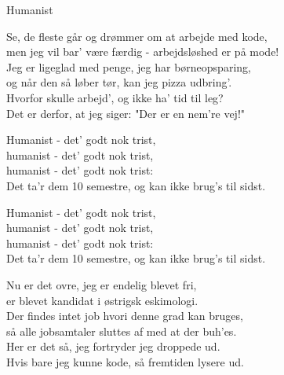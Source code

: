 \begin{song}{Humanist}

  \begin{SBVerse}
    Se, de fleste går og drømmer om at arbejde med kode,\\
    men jeg vil bar' være færdig - arbejdsløshed er på mode!\\
    Jeg er ligeglad med penge, jeg har børneopsparing,\\
    og når den så løber tør, kan jeg pizza udbring'.\\
    Hvorfor skulle arbejd', og ikke ha' tid til leg?\\
    Det er derfor, at jeg siger: "Der er en nem're vej!"
  \end{SBVerse}

  \begin{SBChorus}
    Humanist - det' godt nok trist,\\
    humanist - det' godt nok trist,\\
    humanist - det' godt nok trist:\\
    Det ta'r dem 10 semestre, og kan ikke brug's til sidst.
  \end{SBChorus}

  \begin{SBChorus}
    Humanist - det' godt nok trist,\\
    humanist - det' godt nok trist,\\
    humanist - det' godt nok trist:\\
    Det ta'r dem 10 semestre, og kan ikke brug's til sidst.
  \end{SBChorus}



  \begin{SBVerse}
    Nu er det ovre, jeg er endelig blevet fri,\\
    er blevet kandidat i østrigsk eskimologi.\\
    Der findes intet job hvori denne grad kan bruges,\\
    så alle jobsamtaler sluttes af med at der buh'es.\\
    Her er det så, jeg fortryder jeg droppede ud.\\
    Hvis bare jeg kunne kode, så fremtiden lysere ud.
  \end{SBVerse}


\end{song}
